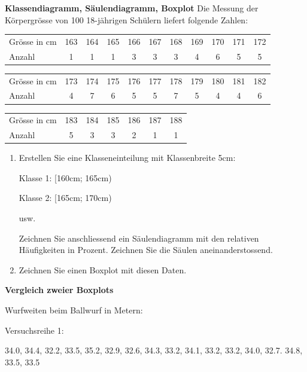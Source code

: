 \textbf{Klassendiagramm, Säulendiagramm, Boxplot}
 Die Messung der Körpergrösse von 100 18-jährigen Schülern liefert
 folgende Zahlen:

 \begin{tabular}{lcccccccccc}
   Grösse in cm & 163 & 164 & 165 & 166 & 167 & 168 & 169 & 170 & 171 & 172\\
   Anzahl      &  1  &  1  &  1  &  3  &  3  &  3  &  4  &  6  &  5  &  5
   \end{tabular}

 \begin{tabular}{lcccccccccc}
   Grösse in cm & 173 & 174 & 175 & 176 & 177 & 178 & 179 & 180 & 181 & 182\\
   Anzahl      &  4  &  7  &  6  &  5  &  5  &  7  &  5  &  4  &  4  &  6
   \end{tabular}

  \begin{tabular}{lcccccc}
   Grösse in cm & 183 & 184 & 185 & 186 & 187 & 188\\
   Anzahl      &  5  &  3  &  3  &  2  &  1  &  1 
  \end{tabular}

  \begin{enumerate}[label=\alph*)]
  \item Erstellen Sie eine Klasseneinteilung mit Klassenbreite 5cm:

    Klasse 1: [160cm; 165cm)

      Klasse 2: [165cm; 170cm)

        usw.

        Zeichnen Sie anschliessend ein Säulendiagramm mit den relativen
        Häufigkeiten in Prozent. Zeichnen Sie die Säulen
        aneinanderstossend.

        \item Zeichnen Sie einen Boxplot mit diesen Daten.
\end{enumerate}














\textbf{Vergleich zweier Boxplots}

  Wurfweiten beim Ballwurf in Metern:

  Versuchsreihe 1:

  34.0, 34.4, 32.2, 33.5, 35.2, 32.9, 32.6, 34.3, 33.2, 34.1,
  33.2, 33.2, 34.0, 32.7. 34.8, 33.5, 33.5

